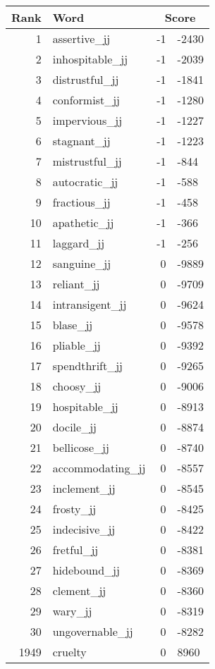 \begin{longtable}[!htbp]{| rlr@{.}l |}
    \hline
    \textbf{Rank} & \textbf{Word} & \multicolumn{2}{c|}{\textbf{Score}} \\
    \hline
    \endhead
    1 & assertive\_jj & -1 & -2430 \\
    2 & inhospitable\_jj & -1 & -2039 \\
    3 & distrustful\_jj & -1 & -1841 \\
    4 & conformist\_jj & -1 & -1280 \\
    5 & impervious\_jj & -1 & -1227 \\
    6 & stagnant\_jj & -1 & -1223 \\
    7 & mistrustful\_jj & -1 & -844 \\
    8 & autocratic\_jj & -1 & -588 \\
    9 & fractious\_jj & -1 & -458 \\
    10 & apathetic\_jj & -1 & -366 \\
    11 & laggard\_jj & -1 & -256 \\
    12 & sanguine\_jj & 0 & -9889 \\
    13 & reliant\_jj & 0 & -9709 \\
    14 & intransigent\_jj & 0 & -9624 \\
    15 & blase\_jj & 0 & -9578 \\
    16 & pliable\_jj & 0 & -9392 \\
    17 & spendthrift\_jj & 0 & -9265 \\
    18 & choosy\_jj & 0 & -9006 \\
    19 & hospitable\_jj & 0 & -8913 \\
    20 & docile\_jj & 0 & -8874 \\
    21 & bellicose\_jj & 0 & -8740 \\
    22 & accommodating\_jj & 0 & -8557 \\
    23 & inclement\_jj & 0 & -8545 \\
    24 & frosty\_jj & 0 & -8425 \\
    25 & indecisive\_jj & 0 & -8422 \\
    26 & fretful\_jj & 0 & -8381 \\
    27 & hidebound\_jj & 0 & -8369 \\
    28 & clement\_jj & 0 & -8360 \\
    29 & wary\_jj & 0 & -8319 \\
    30 & ungovernable\_jj & 0 & -8282 \\
    1949 & cruelty & 0 & 8960 \\

\end{longtable}
